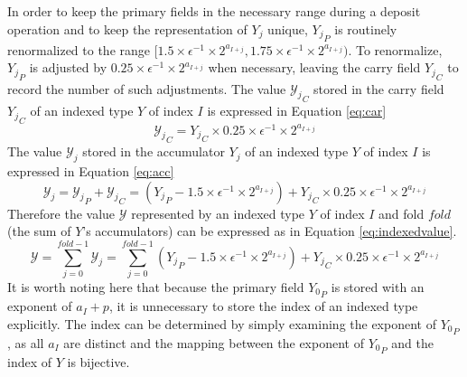 \documentclass[12pt]{article}
\theoremstyle{plain}
\numberwithin{equation}{section}
\begin{document}
      In order to keep the primary fields in the necessary range during a deposit operation and to keep the representation of $Y_j$ unique, ${Y_j}_P$ is routinely renormalized to the range $[1.5 \times\epsilon^{-1} \times 2^{a_{I + j}}, 1.75 \times\epsilon^{-1} \times 2^{a_{I + j}})$.
      To renormalize, ${Y_j}_P$ is adjusted by $0.25 \times\epsilon^{-1} \times 2^{a_{I + j}}$ when necessary, leaving the carry field ${Y_j}_C$ to record the number of such adjustments.
      The value ${\mathcal{Y}_j}_C$ stored in the carry field ${Y_j}_C$ of an indexed type $Y$ of index $I$ is expressed in Equation \ref{eq:car}
      \begin{equation}
        {\mathcal{Y}_j}_C = {Y_j}_C \times 0.25\times\epsilon^{-1}\times2^{a_{I + j}}
        \label{eq:car}
      \end{equation}
      The value $\mathcal{Y}_j$ stored in the accumulator $Y_j$ of an indexed type $Y$ of index $I$ is expressed in Equation \ref{eq:acc}
      \begin{equation}
        \mathcal{Y}_j = {\mathcal{Y}_j}_P + {\mathcal{Y}_j}_C = ({Y_j}_P - 1.5 \times\epsilon^{-1}\times 2^{a_{I + j}}) + {Y_j}_C \times 0.25\times\epsilon^{-1}\times2^{a_{I + j}}
        \label{eq:acc}
      \end{equation}
      Therefore the value $\mathcal{Y}$ represented by an indexed type $Y$ of index $I$ and fold $fold$ (the sum of $Y$'s accumulators) can be expressed as in Equation \ref{eq:indexedvalue}.
      \begin{equation}
        \mathcal{Y} = \sum\limits_{j = 0}^{fold - 1} \mathcal{Y}_j = \sum\limits_{j = 0}^{fold - 1} ({Y_j}_P - 1.5 \times\epsilon^{-1}\times 2^{a_{I + j}}) + {Y_j}_C \times 0.25\times\epsilon^{-1}\times2^{a_{I + j}}
        \label{eq:indexedvalue}
      \end{equation}
      It is worth noting here that because the primary field ${Y_0}_P$ is stored with an exponent of $a_I + p$, it is unnecessary to store the index of an indexed type explicitly. The index can be determined by simply examining the exponent of ${Y_0}_P$, as all $a_I$ are distinct and the mapping between the exponent of ${Y_0}_P$ and the index of $Y$ is bijective.
\end{document}
